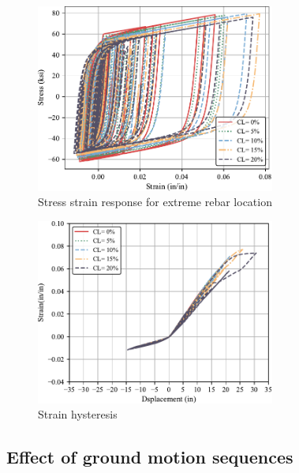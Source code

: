 \begin{figure}[htbp]
	\centering
	\includegraphics[width=0.7\textwidth]{Chapter-5/figs/Stress_Strain_RSN1505.pdf}
	\caption{Stress strain response for extreme rebar location}
	\label{fig:Steel_Stress_Strain_Response}
\end{figure}

\begin{figure}[htbp]
	\centering
	\includegraphics[width=0.7\textwidth]{Chapter-5/figs/Diplacement_Strain_RSN1505.pdf}
	\caption{Strain hysteresis}
	\label{fig:Steel_Strain_Response}
\end{figure}

\subsection{Effect of ground motion sequences}

